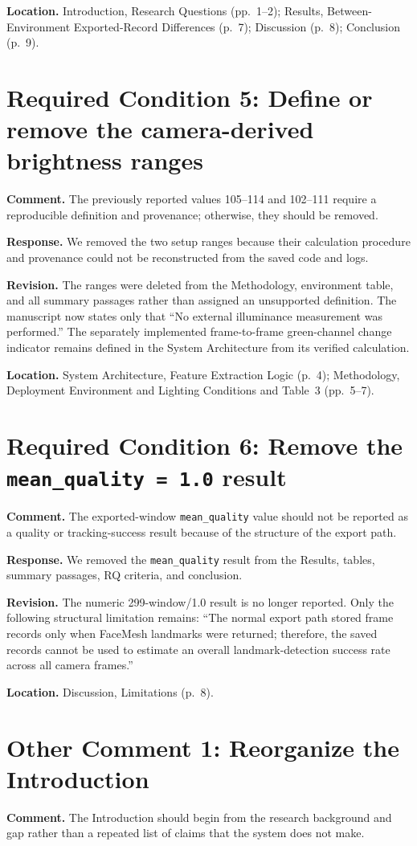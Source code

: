 \documentclass[11pt]{article}
\newcommand{\responseitem}[2]{\section*{#1: #2}}
\begin{document}
\textbf{Location.}
Introduction, Research Questions (pp.~1--2); Results, Between-Environment Exported-Record Differences (p.~7); Discussion (p.~8); Conclusion (p.~9).

\responseitem{Required Condition 5}{Define or remove the camera-derived brightness ranges}

\textbf{Comment.}
The previously reported values 105--114 and 102--111 require a reproducible definition and provenance; otherwise, they should be removed.

\textbf{Response.}
We removed the two setup ranges because their calculation procedure and provenance could not be reconstructed from the saved code and logs.

\textbf{Revision.}
The ranges were deleted from the Methodology, environment table, and all summary passages rather than assigned an unsupported definition.
The manuscript now states only that ``No external illuminance measurement was performed.''
The separately implemented frame-to-frame green-channel change indicator remains defined in the System Architecture from its verified calculation.

\textbf{Location.}
System Architecture, Feature Extraction Logic (p.~4); Methodology, Deployment Environment and Lighting Conditions and Table~3 (pp.~5--7).

\responseitem{Required Condition 6}{Remove the \texttt{mean\_quality = 1.0} result}

\textbf{Comment.}
The exported-window \texttt{mean\_quality} value should not be reported as a quality or tracking-success result because of the structure of the export path.

\textbf{Response.}
We removed the \texttt{mean\_quality} result from the Results, tables, summary passages, RQ criteria, and conclusion.

\textbf{Revision.}
The numeric 299-window/1.0 result is no longer reported.
Only the following structural limitation remains: ``The normal export path stored frame records only when FaceMesh landmarks were returned; therefore, the saved records cannot be used to estimate an overall landmark-detection success rate across all camera frames.''

\textbf{Location.}
Discussion, Limitations (p.~8).

\responseitem{Other Comment 1}{Reorganize the Introduction}

\textbf{Comment.}
The Introduction should begin from the research background and gap rather than a repeated list of claims that the system does not make.
\end{document}
